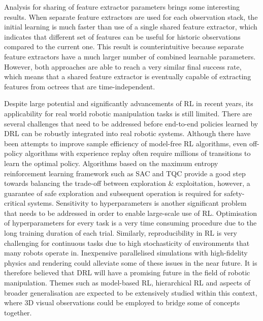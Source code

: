Analysis for sharing of feature extractor parameters brings some interesting results. When separate feature extractors are used for each observation stack, the initial learning is much faster than use of a single shared feature extractor, which indicates that different set of features can be useful for historic observations compared to the current one. This result is counterintuitive because separate feature extractors have a much larger number of combined learnable parameters. However, both approaches are able to reach a very similar final success rate, which means that a shared feature extractor is eventually capable of extracting features from octrees that are time-independent.

Despite large potential and significantly advancements of RL in recent years, its applicability for real world robotic manipulation tasks is still limited. There are several challenges that need to be addressed before end-to-end policies learned by DRL can be robustly integrated into real robotic systems. Although there have been attempts to improve sample efficiency of model-free RL algorithms, even off-policy algorithms with experience replay often require millions of transitions to learn the optimal policy. Algorithms based on the maximum entropy reinforcement learning framework such as SAC and TQC provide a good step towards balancing the trade-off between exploration \& exploitation, however, a guarantee of safe exploration and subsequent operation is required for safety-critical systems. Sensitivity to hyperparameters is another significant problem that needs to be addressed in order to enable large-scale use of RL. Optimisation of hyperparameters for every task is a very time consuming procedure due to the long training duration of each trial. Similarly, reproducibility in RL is very challenging for continuous tasks due to high stochasticity of environments that many robots operate in. Inexpensive parallelised simulations with high-fidelity physics and rendering could alleviate some of these issues in the near future. It is therefore believed that DRL will have a promising future in the field of robotic manipulation. Themes such as model-based RL, hierarchical RL and aspects of broader generalisation are expected to be extensively studied within this context, where 3D visual observations could be employed to bridge some of concepts together.
